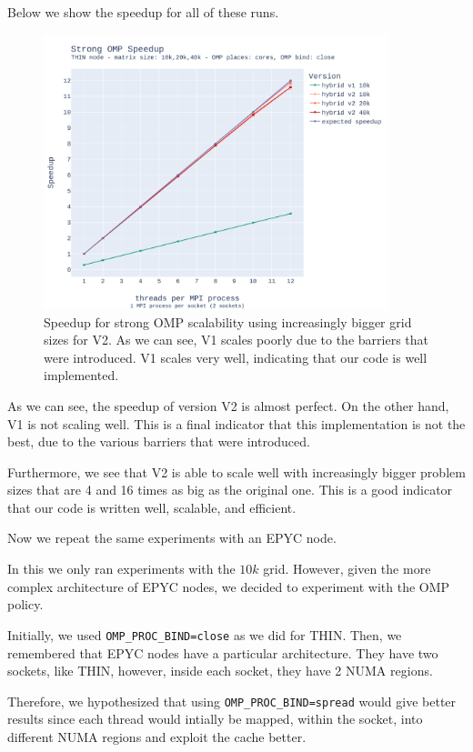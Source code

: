 \documentclass{report}
\begin{document}
Below we show the speedup for all of these runs.

\begin{figure}[H]
\centering
\includegraphics[width=10cm, height=8cm]{./images/strong_OMP_thin_hybrid_speedup.pdf}
\caption{\label{fig:strongompspeedupthin} Speedup for strong OMP scalability using 
increasingly bigger grid sizes for V2. As we can see, V1 scales poorly due to the 
barriers that were introduced. V1 scales very well, indicating that our code 
is well implemented.}
\end{figure}

As we can see, the speedup of version V2 is almost perfect. On the other hand, 
V1 is not scaling well. This is a final indicator that this implementation is not 
the best, due to the various barriers that were introduced. 

Furthermore, we see that V2 is able to scale well with increasingly bigger 
problem sizes that are 4 and 16 times as big as the original one. 
This is a good indicator that our code is written well, scalable, and efficient.   

Now we repeat the same experiments with an EPYC node.

In this we only ran experiments with the $10k$ grid. However, given the more 
complex architecture of EPYC nodes, we decided to experiment with the OMP policy.

Initially, we used \texttt{OMP\_PROC\_BIND=close} as we did for THIN. Then, we 
remembered that EPYC nodes have a particular architecture. They have two 
sockets, like THIN, however, inside each socket, they have 2 NUMA regions. 

Therefore, we hypothesized that using \texttt{OMP\_PROC\_BIND=spread} 
would give better results since each thread would intially be mapped, within the 
socket, into different NUMA regions and exploit the cache better.
\end{document}
